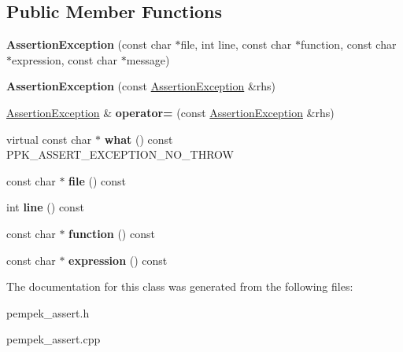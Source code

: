 \subsection*{Public Member Functions}
\begin{DoxyCompactItemize}
\item 
\hypertarget{classpempek_1_1assert_1_1_assertion_exception_a085718100146da1f43fad9c8ff8a04c3}{}{\bfseries Assertion\+Exception} (const char $\ast$file, int line, const char $\ast$function, const char $\ast$expression, const char $\ast$message)\label{classpempek_1_1assert_1_1_assertion_exception_a085718100146da1f43fad9c8ff8a04c3}

\item 
\hypertarget{classpempek_1_1assert_1_1_assertion_exception_a831b89bd127de1e913f303d9c7fc67e1}{}{\bfseries Assertion\+Exception} (const \hyperlink{classpempek_1_1assert_1_1_assertion_exception}{Assertion\+Exception} \&rhs)\label{classpempek_1_1assert_1_1_assertion_exception_a831b89bd127de1e913f303d9c7fc67e1}

\item 
\hypertarget{classpempek_1_1assert_1_1_assertion_exception_a69433bbae8016750078be991f4076502}{}\hyperlink{classpempek_1_1assert_1_1_assertion_exception}{Assertion\+Exception} \& {\bfseries operator=} (const \hyperlink{classpempek_1_1assert_1_1_assertion_exception}{Assertion\+Exception} \&rhs)\label{classpempek_1_1assert_1_1_assertion_exception_a69433bbae8016750078be991f4076502}

\item 
\hypertarget{classpempek_1_1assert_1_1_assertion_exception_a16600ca18864265781ab4bd24ca0eb8a}{}virtual const char $\ast$ {\bfseries what} () const P\+P\+K\+\_\+\+A\+S\+S\+E\+R\+T\+\_\+\+E\+X\+C\+E\+P\+T\+I\+O\+N\+\_\+\+N\+O\+\_\+\+T\+H\+R\+O\+W\label{classpempek_1_1assert_1_1_assertion_exception_a16600ca18864265781ab4bd24ca0eb8a}

\item 
\hypertarget{classpempek_1_1assert_1_1_assertion_exception_a659fa314977eec7f56fc16601ef30f59}{}const char $\ast$ {\bfseries file} () const \label{classpempek_1_1assert_1_1_assertion_exception_a659fa314977eec7f56fc16601ef30f59}

\item 
\hypertarget{classpempek_1_1assert_1_1_assertion_exception_a4879fdc57b3252b8b04a872215e7c2f3}{}int {\bfseries line} () const \label{classpempek_1_1assert_1_1_assertion_exception_a4879fdc57b3252b8b04a872215e7c2f3}

\item 
\hypertarget{classpempek_1_1assert_1_1_assertion_exception_a020e713ea8d385930d743ff9be017bdf}{}const char $\ast$ {\bfseries function} () const \label{classpempek_1_1assert_1_1_assertion_exception_a020e713ea8d385930d743ff9be017bdf}

\item 
\hypertarget{classpempek_1_1assert_1_1_assertion_exception_aa134ffed2284833917cff6814743fa46}{}const char $\ast$ {\bfseries expression} () const \label{classpempek_1_1assert_1_1_assertion_exception_aa134ffed2284833917cff6814743fa46}

\end{DoxyCompactItemize}


The documentation for this class was generated from the following files\+:\begin{DoxyCompactItemize}
\item 
pempek\+\_\+assert.\+h\item 
pempek\+\_\+assert.\+cpp\end{DoxyCompactItemize}
